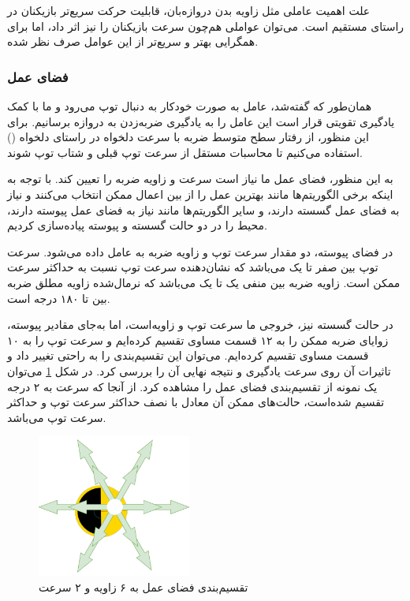 علت اهمیت عاملی مثل زاویه بدن دروازه‌بان، قابلیت حرکت سریع‌تر بازیکنان در راستای مستقیم است. می‌توان عواملی هم‌چون سرعت بازیکنان را نیز اثر داد،
اما برای همگرایی بهتر و سریع‌تر از این عوامل صرف نظر شده.
\subsubsection{فضای عمل}
همان‌طور که گفته‌شد، عامل به صورت خودکار به دنبال توپ می‌رود و ما با کمک یادگیری تقویتی قرار است این عامل را به یادگیری ضربه‌زدن به دروازه برسانیم.
برای این منظور، از رفتار سطح متوسط ضربه با سرعت دلخواه در راستای دلخواه ()
 استفاده می‌کنیم تا محاسبات مستقل از سرعت توپ قبلی و شتاب توپ شوند.

 به این منظور، فضای عمل ما نیاز است سرعت و زاویه ضربه را تعیین کند.
 با توجه به اینکه برخی الگوریتم‌ها مانند  بهترین عمل را از بین اعمال ممکن انتخاب می‌کنند و نیاز به فضای عمل گسسته دارند،
و سایر الگوریتم‌ها مانند  نیاز به فضای عمل پیوسته دارند،
محیط را در دو حالت گسسته و پیوسته پیاده‌سازی کردیم.

در فضای پیوسته، دو مقدار سرعت توپ و زاویه ضربه به عامل داده می‌شود.
سرعت توپ بین صفر تا یک می‌باشد که نشان‌دهنده سرعت توپ نسبت به حداکثر سرعت ممکن است.
زاویه ضربه بین منفی یک تا یک می‌باشد که نرمال‌شده زاویه مطلق ضربه بین  تا ۱۸۰ درجه است.

در حالت گسسته نیز، خروجی ما سرعت توپ و زاویه‌است، اما به‌جای مقادیر پیوسته، زوایای ضربه ممکن را به ۱۲ قسمت مساوی تقسیم کرده‌ایم و سرعت توپ را به ۱۰ قسمت مساوی تقسیم کرده‌ایم.
می‌توان این تقسیم‌بندی را به راحتی تغییر داد و تاثیرات آن روی سرعت یادگیری و نتیجه نهایی آن را بررسی کرد.
در شکل \ref{fig:discretization} می‌توان یک نمونه از تقسیم‌بندی فضای عمل را مشاهده کرد.
از آنجا که سرعت به ۲ درجه تقسیم شده‌است، حالت‌های ممکن آن معادل با نصف حداکثر سرعت توپ و حداکثر سرعت توپ می‌باشد.
\begin{figure}[H]
    \centering
    \includegraphics[width=0.45\textwidth]{images/discretization.drawio.png}
    \caption{تقسیم‌بندی فضای عمل به ۶ زاویه و ۲ سرعت}\label{fig:discretization}
\end{figure}
